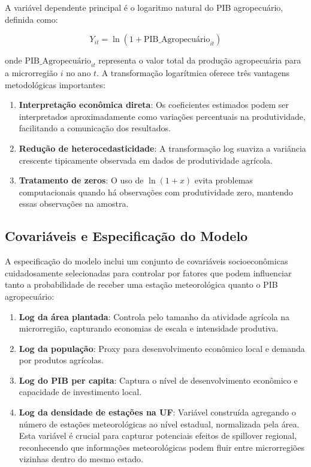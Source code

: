 \documentclass[
	12pt,				%
	oneside,			%
	a4paper,			%
	english,			%
	french,				%
	spanish,			%
	brazil				%
	]{abntex2}
\begin{document}
A variável dependente principal é o logaritmo natural do PIB agropecuário, definida como:

\begin{equation}
Y_{it} = \ln(1 + \text{PIB\_Agropecuário}_{it})
\end{equation}

onde $\text{PIB\_Agropecuário}_{it}$ representa o valor total da produção agropecuária para a microrregião $i$ no ano $t$. A transformação logarítmica oferece três vantagens metodológicas importantes:

\begin{enumerate}
\item \textbf{Interpretação econômica direta}: Os coeficientes estimados podem ser interpretados aproximadamente como variações percentuais na produtividade, facilitando a comunicação dos resultados.

\item \textbf{Redução de heterocedasticidade}: A transformação log suaviza a variância crescente tipicamente observada em dados de produtividade agrícola.

\item \textbf{Tratamento de zeros}: O uso de $\ln(1+x)$ evita problemas computacionais quando há observações com produtividade zero, mantendo essas observações na amostra.
\end{enumerate}

\subsection{Covariáveis e Especificação do Modelo}

A especificação do modelo inclui um conjunto de covariáveis socioeconômicas cuidadosamente selecionadas para controlar por fatores que podem influenciar tanto a probabilidade de receber uma estação meteorológica quanto o PIB agropecuário:

\begin{enumerate}
\item \textbf{Log da área plantada}: Controla pelo tamanho da atividade agrícola na microrregião, capturando economias de escala e intensidade produtiva.

\item \textbf{Log da população}: Proxy para desenvolvimento econômico local e demanda por produtos agrícolas.

\item \textbf{Log do PIB per capita}: Captura o nível de desenvolvimento econômico e capacidade de investimento local.

\item \textbf{Log da densidade de estações na UF}: Variável construída agregando o número de estações meteorológicas ao nível estadual, normalizada pela área. Esta variável é crucial para capturar potenciais efeitos de spillover regional, reconhecendo que informações meteorológicas podem fluir entre microrregiões vizinhas dentro do mesmo estado.
\end{enumerate}
\end{document}
